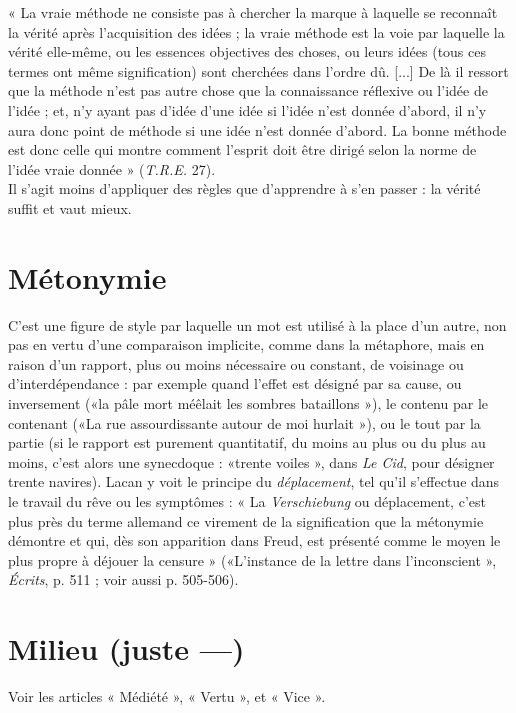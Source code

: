 {\footnotesize
« La vraie méthode ne consiste pas à chercher la marque à laquelle se reconnaît la
vérité après l’acquisition des idées ; la vraie méthode est la voie par laquelle la vérité
elle-même, ou les essences objectives des choses, ou leurs idées (tous ces termes ont même
signification) sont cherchées dans l’ordre dû. [...] De là il ressort que la méthode n’est
pas autre chose que la connaissance réflexive ou l’idée de l’idée ; et, n’y ayant pas d’idée
d’une idée si l’idée n’est donnée d’abord, il n’y aura donc point de méthode si une idée
n’est donnée d’abord. La bonne méthode est donc celle qui montre comment l'esprit
doit être dirigé selon la norme de l’idée vraie donnée » ({\it T.R.E.} 27).
}\\

Il s’agit moins d’appliquer des règles que d’apprendre à s’en passer : la
vérité suffit et vaut mieux.

\section{Métonymie}
C’est une figure de style par laquelle un mot est utilisé à la
place d’un autre, non pas en vertu d’une comparaison implicite,
comme dans la métaphore, mais en raison d’un rapport, plus ou moins
nécessaire ou constant, de voisinage ou d’interdépendance : par exemple quand
l'effet est désigné par sa cause, ou inversement («la pâle mort méêlait les
sombres bataillons »), le contenu par le contenant («La rue assourdissante
autour de moi hurlait »), ou le tout par la partie (si le rapport est purement
quantitatif, du moins au plus ou du plus au moins, c’est alors une synecdoque :
«trente voiles », dans {\it Le Cid}, pour désigner trente navires). Lacan y voit le
principe du {\it déplacement}, tel qu’il s'effectue dans le travail du rêve ou les
symptômes : « La {\it Verschiebung} ou déplacement, c’est plus près du terme allemand
ce virement de la signification que la métonymie démontre et qui, dès
son apparition dans Freud, est présenté comme le moyen le plus propre à
déjouer la censure » («L’instance de la lettre dans l'inconscient », {\it Écrits},
p. 511 ; voir aussi p. 505-506).

\section{Milieu (juste —)}
Voir les articles « Médiété », « Vertu », et « Vice ».

